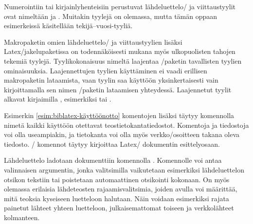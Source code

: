 Numerointiin tai kirjainlyhenteisiin perustuvat lähdeluettelo\-/{} ja
viittaustyylit ovat nimeltään  ja
. Muitakin tyylejä on olemassa, mutta tämän
oppaan esimerkeissä käsitellään tekijä--vuosi-tyyliä.

Makropaketin omien lähdeluettelo\-/{} ja viittaustyylien lisäksi
Latex\-/jakelupaketissa on todennäköisesti mukana myös ulkopuolisten
tahojen tekemiä tyylejä. Tyylikokonaisuus nimeltä
 laajentaa
\-/paketin tavallisten tyylien ominaisuuksia.
Laajennettujen tyylien käyttäminen ei vaadi erillisen makropaketin
lataamista, vaan tyylin saa käyttöön yksinkertaisesti vain
kirjoittamalla sen nimen \-/paketin lataamisen
yhteydessä. Laajennetut tyylit alkavat kirjaimilla \mbox{,}
esimerkiksi  tai .

Esimerkin \ref{esim:biblatex-käyttöönotto} komentojen lisäksi täytyy
komennolla  nimetä kaikki käyttöön otettavat
teostietokantatiedostot. Komentoja ja tiedostoja voi olla useampiakin,
ja tietokanta voi olla myös verkko\-/osoitteen takana oleva tiedosto.
\-/ komennot täytyy kirjoittaa Latex\-/
dokumentin esittelyosaan.

\begin{koodilohkosis}



\end{koodilohkosis}

Lähdeluettelo ladotaan dokumenttiin komennolla
. Komennolle voi antaa valinnaisen
argumentin, jonka valitsimilla vaikutetaan esimerkiksi lähdeluettelon
otsikon tekstiin tai poistetaan automaattinen otsikointi kokonaan. On
myös olemassa erilaisia lähdeteosten rajaamisvalitsimia, joiden avulla
voi määrittää, mitä teoksia kyseiseen luetteloon halutaan. Näin voidaan
esimerkiksi rajata painetut lähteet yhteen luetteloon, julkaisemattomat
toiseen ja verkkolähteet kolmanteen.

\begin{koodilohkosis}
\printbibliography
\printbibliography[title={Lähteet}]
\printbibliography[heading=none,  %
  type=online]           %
\end{koodilohkosis}

